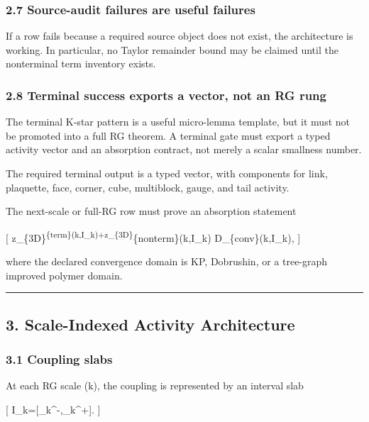 \documentclass[
]{article}
\begin{document}
\subsubsection{2.7 Source-audit failures are useful
failures}\label{source-audit-failures-are-useful-failures}

If a row fails because a required source object does not exist, the
architecture is working. In particular, no Taylor remainder bound may be
claimed until the nonterminal term inventory exists.

\subsubsection{2.8 Terminal success exports a vector, not an RG
rung}\label{terminal-success-exports-a-vector-not-an-rg-rung}

The terminal K-star pattern is a useful micro-lemma template, but it
must not be promoted into a full RG theorem. A terminal gate must export
a typed activity vector and an absorption contract, not merely a scalar
smallness number.

The required terminal output is a typed vector, with components for
link, plaquette, face, corner, cube, multiblock, gauge, and tail
activity.

The next-scale or full-RG row must prove an absorption statement

{[}
\mathbf z\_\{3D\}\textsuperscript{\{\rm term\}(k,I\_k)+\mathbf z\_\{3D\}}\{\rm nonterm\}(k,I\_k)
\in \mathcal D\_\{\rm conv\}(k,I\_k), {]}

where the declared convergence domain is KP, Dobrushin, or a tree-graph
improved polymer domain.

\begin{center}\rule{0.5\linewidth}{0.5pt}\end{center}

\subsection{3. Scale-Indexed Activity
Architecture}\label{scale-indexed-activity-architecture}

\subsubsection{3.1 Coupling slabs}\label{coupling-slabs}

At each RG scale (k), the coupling is represented by an interval slab

{[} I\_k={[}\beta\_k\^{}-,\beta\_k\^{}+{]}. {]}
\end{document}
